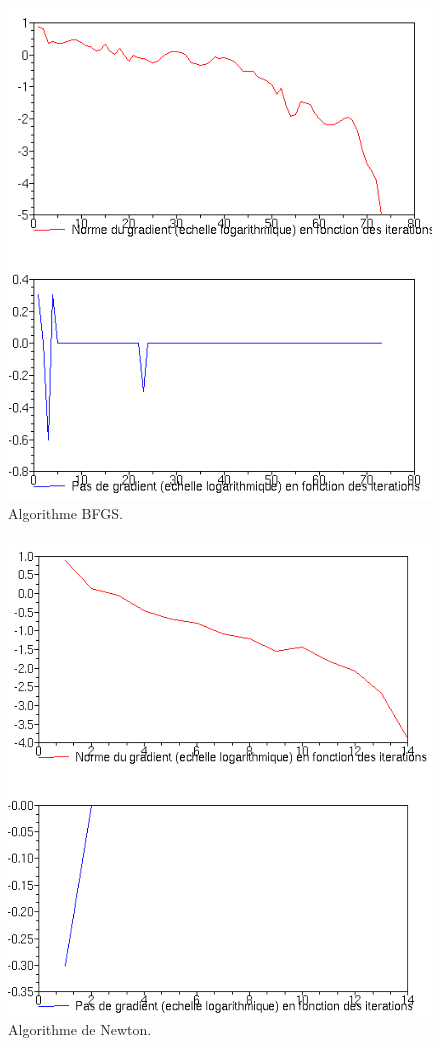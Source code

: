 \documentclass[11pt]{article}
\begin{document}
\begin{figure}[H]
  \centering
    \includegraphics[width=0.95 \textwidth]{Images/BGFS.png}
  \caption{Algorithme BFGS.}
\end{figure}
\begin{figure}[H]
  \centering
    \includegraphics[width=0.95 \textwidth]{Images/newton.png}
  \caption{Algorithme de Newton.}
\end{figure}
\end{document}
